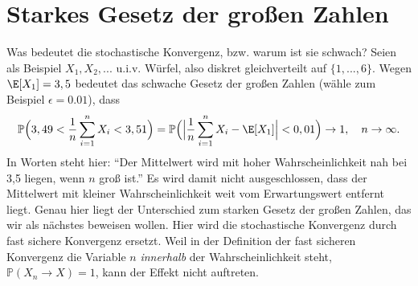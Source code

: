 



\section{Starkes Gesetz der großen Zahlen}
	Was bedeutet die stochastische Konvergenz, bzw. warum ist sie schwach? Seien als Beispiel $X_1,X_2,...$ u.i.v. Würfel, also diskret gleichverteilt auf $\{1,...,6\}$. Wegen $\E[X_1]=3,5$ bedeutet das schwache Gesetz der großen Zahlen (w\"ahle zum Beispiel $\epsilon=0.01$), dass 
	\[ \mathbb{P}\Big(3,49 < \frac{1}{n} \sum\limits_{i=1}^{n} X_i < 3,51\Big) = \mathbb{P}\Big(\Big|\frac 1 n\sum\limits_{i=1}^{n} X_i - \E[X_1]\Big| < 0,01\Big) \to 1, \quad n \to \infty. \]
	In Worten steht hier: \enquote{Der Mittelwert wird mit hoher Wahrscheinlichkeit nah bei 3,5 liegen, wenn $n$ groß ist.} Es wird damit nicht ausgeschlossen, dass der Mittelwert mit kleiner Wahrscheinlichkeit weit vom Erwartungswert entfernt liegt. Genau hier liegt der Unterschied zum starken Gesetz der gro\ss en Zahlen, das wir als n\"achstes beweisen wollen. Hier wird die stochastische Konvergenz durch fast sichere Konvergenz ersetzt. Weil in der Definition der fast sicheren Konvergenz die Variable $n$ \textit{innerhalb} der Wahrscheinlichkeit steht, $\mathbb P(X_n\to X)=1$, kann der Effekt nicht auftreten.\smallskip

